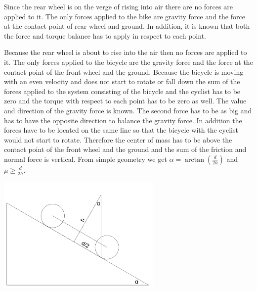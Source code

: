 \hinteng
Since the rear wheel is on the verge of rising into air there are no forces are applied to it. The only forces applied to the bike are gravity force and the force at the contact point of rear wheel and ground. In addition, it is known that both the force and torque balance has to apply in respect to each point.

\solueng
Because the rear wheel is about to rise into the air then no forces are applied to it. The only forces applied to the bicycle are the gravity force and the force at the contact point of the front wheel and the ground. Because the bicycle is moving with an even velocity and does not start to rotate or fall down the sum of the forces applied to the system consisting of the bicycle and the cyclist has to be zero and the torque with respect to each point has to be zero as well. The value and direction of the gravity force is known. The second force has to be as big and has to have the opposite direction to balance the gravity force. In addition the forces have to be located on the same line so that the bicycle with the cyclist would not start to rotate. Therefore the center of mass has to be above the contact point of the front wheel and the ground and the sum of the friction and normal force is vertical. From simple geometry we get $\alpha=\arctan(\frac{d}{2h})$ and $\mu\ge\frac{d}{2h}$. 
\begin{center}
\includegraphics[width=0.6\textwidth]{2014-lahg-08-ratas}
\end{center}
\probend